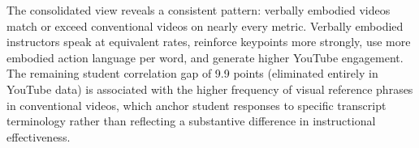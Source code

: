 The consolidated view reveals a consistent pattern: verbally embodied videos match or exceed conventional videos on nearly every metric. Verbally embodied instructors speak at equivalent rates, reinforce keypoints more strongly, use more embodied action language per word, and generate higher YouTube engagement. The remaining student correlation gap of 9.9 points (eliminated entirely in YouTube data) is associated with the higher frequency of visual reference phrases in conventional videos, which anchor student responses to specific transcript terminology rather than reflecting a substantive difference in instructional effectiveness.

